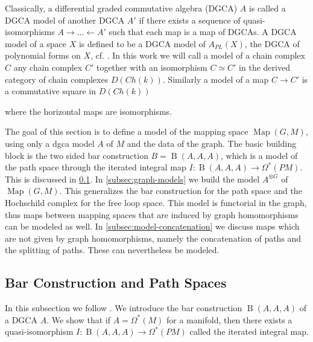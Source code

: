 \documentclass{scrartcl}
\theoremstyle{plain}
\theoremstyle{definition}
\newcommand{\APL}{A_{PL}}
\newcommand{\quiso}{\simeq}
\newcommand{\from}{\leftarrow}
\DeclareMathOperator{\Map}{Map}
\DeclareMathOperator{\BC}{B}
\begin{document}
Classically, a differential graded commutative algebra (DGCA) $A$ is called a DGCA model of another DGCA $A'$ if there exists a sequence of quasi-isomorphisms $A\to\dots\from A'$ such that each map is a map of DGCAs. A DGCA model of a space $X$ is defined to be a DGCA model of $\APL(X)$, the DGCA of polynomial forms on $X$, cf. \cite[ch. 10]{felix2012rational}. In this work we will call a model of a chain complex $C$ any chain complex $C'$ together with an isomorphism $C\quiso C'$ in the derived category of chain complexes $D(Ch(k))$. Similarly a model of a map $C\to C'$ is a commutative square in $D(Ch(k))$
\begin{center}
\end{center}
where the horizontal maps are isomorphisms. 

The goal of this section is to define a model of the mapping space $\Map(G, M)$, using only a dgca model $A$ of $M$ and the data of the graph. The basic building block is the two sided bar construction $B=\BC(A, A, A)$, which is a model of the path space through the iterated integral map $I\colon \BC(A, A, A)\to\Omega^*(PM)$. This is discussed in \cref{subsec:model-path-space}. In \cref{subsec:graph-models} we build the model $A^{\otimes G}$ of $\Map(G, M)$. This generalizes the bar construction for the path space and the Hochschild complex for the free loop space. This model is functorial in the graph, thus maps between mapping spaces that are induced by graph homomorphisms can be modeled as well. In \cref{subsec:model-concatenation} we discuss maps which are not given by graph homomorphisms, namely the concatenation of paths and the splitting of paths. These can nevertheless be modeled. 


\subsection{Bar Construction and Path Spaces}\label{subsec:model-path-space}

In this subsection we follow \cite{naef2019string}. We introduce the bar construction $\BC(A, A, A)$ of a DGCA $A$. We show that if $A=\Omega^*(M)$ for a manifold, then there exists a quasi-isomorphism $I\colon \BC(A, A, A)\to \Omega^*(PM)$ called the iterated integral map. %
\end{document}
